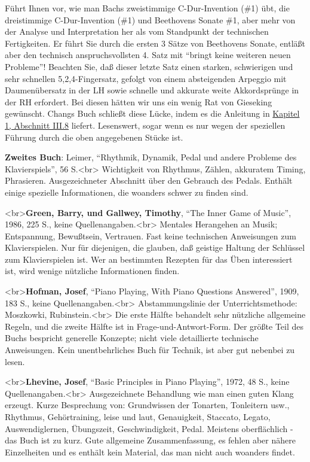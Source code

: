 Führt Ihnen vor, wie man Bachs zweistimmige C-Dur-Invention (\#1) übt, die dreistimmige C-Dur-Invention (\#1) und Beethovens Sonate \#1, aber mehr von der Analyse und Interpretation her als vom Standpunkt der technischen Fertigkeiten.
Er führt Sie durch die ersten 3 Sätze von Beethovens Sonate, entläßt aber den technisch anspruchsvollsten 4. Satz mit \enquote{bringt keine weiteren neuen Probleme}!
Beachten Sie, daß dieser letzte Satz einen starken, schwierigen und sehr schnellen 5,2,4-Fingersatz, gefolgt von einem absteigenden Arpeggio mit Daumenübersatz in der LH sowie schnelle und akkurate weite Akkordsprünge in der RH erfordert.
Bei diesen hätten wir uns ein wenig Rat von Gieseking gewünscht.
Changs Buch schließt diese Lücke, indem es die Anleitung in \hyperref[c1iii8]{Kapitel 1, Abschnitt III.8} liefert.
Lesenswert, sogar wenn es nur wegen der speziellen Führung durch die oben angegebenen Stücke ist.

\textbf{Zweites Buch}: Leimer, \enquote{Rhythmik, Dynamik, Pedal und andere Probleme des Klavierspiels}, 56 S.<br>
Wichtigkeit von Rhythmus, Zählen, akkuratem Timing, Phrasieren.
Ausgezeichneter Abschnitt über den Gebrauch des Pedals.
Enthält einige spezielle Informationen, die woanders schwer zu finden sind.


\label{Green}

<br>\textbf{Green, Barry, und Gallwey, Timothy}, \enquote{The Inner Game of Music}, 1986, 225 S., keine Quellenangaben.<br>
 Mentales Herangehen an Musik; Entspannung, Bewußtsein, Vertrauen.
Fast keine technischen Anweisungen zum Klavierspielen.
Nur für diejenigen, die glauben, daß geistige Haltung der Schlüssel zum Klavierspielen ist.
Wer an bestimmten Rezepten für das Üben interessiert ist, wird wenige nützliche Informationen finden.


\label{Hofman}

<br>\textbf{Hofman, Josef}, \enquote{Piano Playing, With Piano Questions Answered}, 1909, 183 S., keine Quellenangaben.<br>
Abstammungslinie der Unterrichtsmethode: Moszkowki, Rubinstein.<br>
Die erste Hälfte behandelt sehr nützliche allgemeine Regeln, und die zweite Hälfte ist in Frage-und-Antwort-Form.
Der größte Teil des Buchs bespricht generelle Konzepte; nicht viele detaillierte technische Anweisungen.
Kein unentbehrliches Buch für Technik, ist aber gut nebenbei zu lesen.


\label{Lhevine}

<br>\textbf{Lhevine, Josef}, \enquote{Basic Principles in Piano Playing}, 1972, 48 S., keine Quellenangaben.<br> Ausgezeichnete Behandlung wie man einen guten Klang erzeugt.
Kurze Besprechung von: Grundwissen der Tonarten, Tonleitern usw., Rhythmus, Gehörtraining, leise und laut, Genauigkeit, Staccato, Legato, Auswendiglernen, Übungszeit, Geschwindigkeit, Pedal.
Meistens oberflächlich - das Buch ist zu kurz.
Gute allgemeine Zusammenfassung, es fehlen aber nähere Einzelheiten und es enthält kein Material, das man nicht auch woanders findet.


